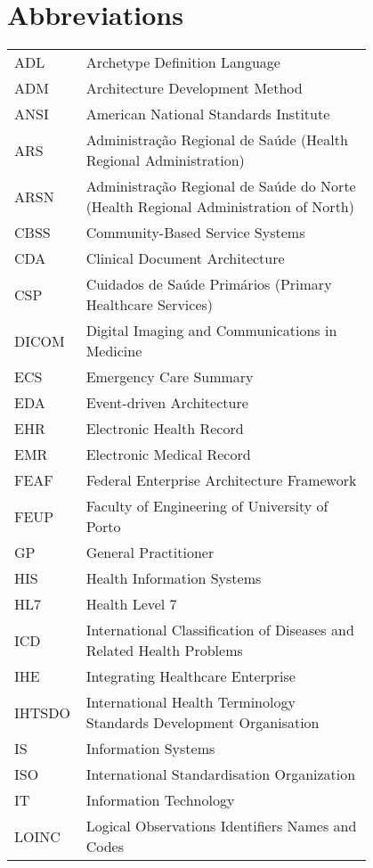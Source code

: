 \chapter*{Abbreviations}

\begin{flushleft}
\begin{tabular}{l p{0.8\linewidth}}
ADL		& Archetype Definition Language \\
ADM		& Architecture Development Method \\
ANSI	& American National Standards Institute \\
ARS		& Administração Regional de Saúde (Health Regional Administration) \\
ARSN	& Administração Regional de Saúde do Norte (Health Regional Administration of North) \\
CBSS	& Community-Based Service Systems \\
CDA		& Clinical Document Architecture \\
CSP		& Cuidados de Saúde Primários (Primary Healthcare Services) \\
DICOM	& Digital Imaging and Communications in Medicine \\
ECS		& Emergency Care Summary \\
EDA		& Event-driven Architecture \\
EHR		& Electronic Health Record \\
EMR		& Electronic Medical Record \\
FEAF	& Federal Enterprise Architecture Framework \\
FEUP	& Faculty of Engineering of University of Porto \\
GP		& General Practitioner \\
HIS		& Health Information Systems \\
HL7		& Health Level 7 \\
ICD		& International Classification of Diseases and Related Health Problems \\
IHE		& Integrating Healthcare Enterprise \\
IHTSDO  & International Health Terminology Standards Development Organisation \\
IS		& Information Systems \\
ISO		& International Standardisation Organization \\
IT		& Information Technology \\
LOINC   & Logical Observations Identifiers Names and Codes \\

\end{tabular}
\end{flushleft}
